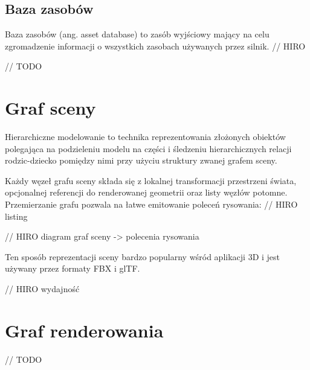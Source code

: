 \subsection{Baza zasobów}
Baza zasobów (ang. asset database) to zasób wyjściowy mający na celu zgromadzenie informacji o wszystkich zasobach używanych przez silnik.
// HIRO



// TODO

\section{Graf sceny}

Hierarchiczne modelowanie to technika reprezentowania złożonych obiektów polegająca na podzieleniu modelu na części i śledzeniu hierarchicznych relacji rodzic-dziecko pomiędzy nimi przy użyciu struktury zwanej grafem sceny.

Każdy węzeł grafu sceny składa się z lokalnej transformacji przestrzeni świata, opcjonalnej referencji do renderowanej geometrii oraz listy węzłów potomne.
Przemierzanie grafu pozwala na łatwe emitowanie poleceń rysowania:
// HIRO listing

// HIRO diagram graf sceny -> polecenia rysowania

Ten sposób reprezentacji sceny bardzo popularny wśród aplikacji 3D i jest używany przez formaty FBX i glTF.

// HIRO wydajność

\section{Graf renderowania}

// TODO